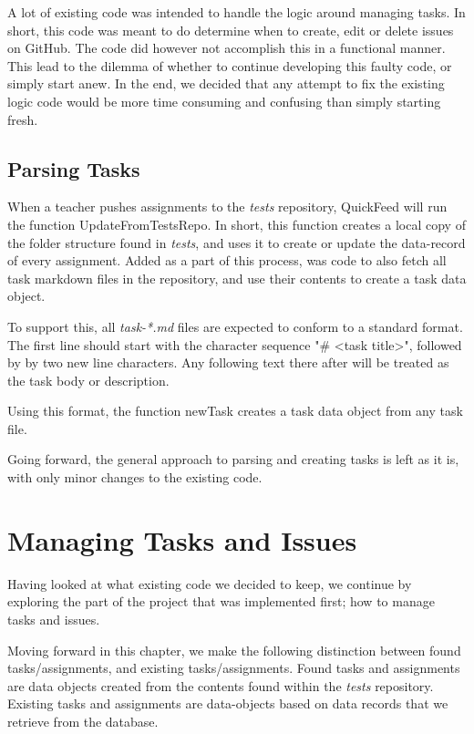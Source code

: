 A lot of existing code was intended to handle the logic around managing tasks. 
In short, this code was meant to do determine when to create, edit or delete issues on GitHub.
The code did however not accomplish this in a functional manner.
This lead to the dilemma of whether to continue developing this faulty code, or simply start anew.
In the end, we decided that any attempt to fix the existing logic code would be more time consuming and confusing than simply starting fresh.

\subsection{Parsing Tasks}
\label{sec:parsing_tasks}

When a teacher pushes assignments to the \textit{tests} repository, QuickFeed will run the function UpdateFromTestsRepo.
In short, this function creates a local copy of the folder structure found in \textit{tests}, and uses it to create or update the data-record of every assignment.
Added as a part of this process, was code to also fetch all task markdown files in the repository, and use their contents to create a task data object.

To support this, all \textit{task-*.md} files are expected to conform to a standard format.
The first line should start with the character sequence "\# <task title>", followed by by two new line characters.
Any following text there after will be treated as the task body or description.

Using this format, the function newTask creates a task data object from any task file.



Going forward, the general approach to parsing and creating tasks is left as it is, with only minor changes to the existing code.

\section{Managing Tasks and Issues}

Having looked at what existing code we decided to keep, we continue by exploring the part of the project that was implemented first; how to manage tasks and issues.

Moving forward in this chapter, we make the following distinction between found tasks/assignments, and existing tasks/assignments.
Found tasks and assignments are data objects created from the contents found within the \textit{tests} repository.
Existing tasks and assignments are data-objects based on data records that we retrieve from the database.

